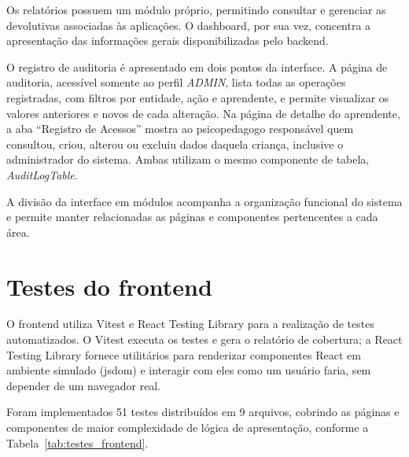 Os relatórios possuem um módulo próprio, permitindo consultar e gerenciar as devolutivas associadas às aplicações. O dashboard, por sua vez, concentra a apresentação das informações gerais disponibilizadas pelo backend.

O registro de auditoria é apresentado em dois pontos da interface. A página de auditoria, acessível somente ao perfil \textit{ADMIN}, lista todas as operações registradas, com filtros por entidade, ação e aprendente, e permite visualizar os valores anteriores e novos de cada alteração. Na página de detalhe do aprendente, a aba ``Registro de Acessos'' mostra ao psicopedagogo responsável quem consultou, criou, alterou ou excluiu dados daquela criança, inclusive o administrador do sistema. Ambas utilizam o mesmo componente de tabela, \textit{AuditLogTable}.

A divisão da interface em módulos acompanha a organização funcional do sistema e permite manter relacionadas as páginas e componentes pertencentes a cada área.

\section{Testes do frontend}

O frontend utiliza Vitest e React Testing Library para a realização de testes automatizados. O Vitest executa os testes e gera o relatório de cobertura; a React Testing Library fornece utilitários para renderizar componentes React em ambiente simulado (jsdom) e interagir com eles como um usuário faria, sem depender de um navegador real.

Foram implementados 51 testes distribuídos em 9 arquivos, cobrindo as páginas e componentes de maior complexidade de lógica de apresentação, conforme a Tabela~\ref{tab:testes_frontend}.

